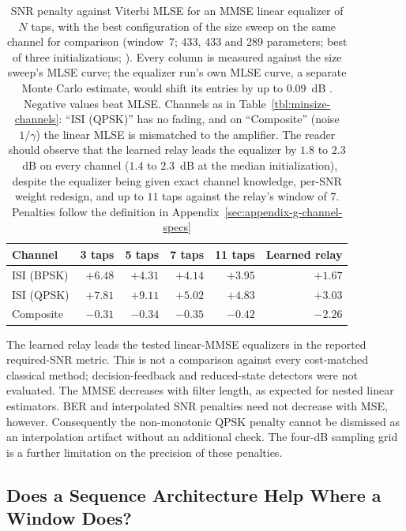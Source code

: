 \begin{table}[htbp]
\centering
\caption[MMSE linear equalization against MLSE]{SNR penalty against Viterbi MLSE for an MMSE linear equalizer of $N$ taps, with the best configuration of the size sweep on the same channel for comparison (window~7; 433, 433 and 289 parameters; best of three initializations; ). Every column is measured against the size sweep's MLSE curve; the equalizer run's own MLSE curve, a separate Monte Carlo estimate, would shift its entries by up to $0.09$~dB . Negative values beat MLSE. Channels as in Table~\ref{tbl:minsize-channels}: ``ISI (QPSK)'' has no fading, and on ``Composite'' (noise $1/\gamma$) the linear MLSE is mismatched to the amplifier. The reader should observe that the learned relay leads the equalizer by $1.8$ to $2.3$~dB on every channel ($1.4$ to $2.3$~dB at the median initialization), despite the equalizer being given exact channel knowledge, per-SNR weight redesign, and up to $11$ taps against the relay's window of $7$. Penalties follow the definition in Appendix~\ref{sec:appendix-g-channel-specs}}\label{tbl:mmse-baseline}
\begin{tabular}{lrrrrr}
\toprule
Channel & 3 taps & 5 taps & 7 taps & 11 taps & Learned relay \\
\midrule
ISI (BPSK)      & $+6.48$ & $+4.31$ & $+4.14$ & $+3.95$ & $\mathbf{+1.67}$ \\
ISI (QPSK)      & $+7.81$ & $+9.11$ & $+5.02$ & $+4.83$ & $\mathbf{+3.03}$ \\
Composite       & $-0.31$ & $-0.34$ & $-0.35$ & $-0.42$ & $\mathbf{-2.26}$ \\
\bottomrule
\end{tabular}
\end{table}

The learned relay leads the tested linear-MMSE equalizers in the reported required-SNR metric. This is not a comparison against every cost-matched classical method; decision-feedback and reduced-state detectors were not evaluated. The MMSE decreases with filter length, as expected for nested linear estimators. BER and interpolated SNR penalties need not decrease with MSE, however. Consequently the non-monotonic QPSK penalty cannot be dismissed as an interpolation artifact without an additional check. The four-dB sampling grid is a further limitation on the precision of these penalties.

\subsection{Does a Sequence Architecture Help Where a Window Does?}\label{sec:sequence-on-memory}

